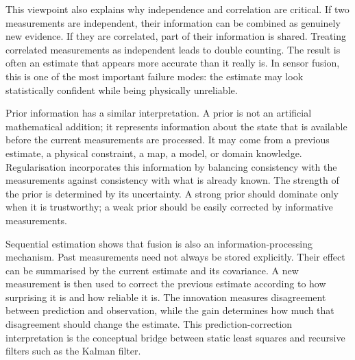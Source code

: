 \documentclass{ieeeaccess}
\newcommand{\deleted}[1]{\textcolor{red}{\sout{#1}}}
\begin{document}


This viewpoint also explains why independence and correlation are critical. If two measurements are independent, their information can be combined as genuinely new evidence. If they are correlated, part of their information is shared. Treating correlated measurements as independent leads to double counting. The result is often an estimate that appears more accurate than it really is. In sensor fusion, this is one of the most important failure modes: the estimate may look statistically confident while being physically unreliable.

Prior information has a similar interpretation. A prior is not an artificial mathematical addition; it represents information about the state that is available before the current measurements are processed. It may come from a previous estimate, a physical constraint, a map, a model, or domain knowledge. Regularisation incorporates this information by balancing consistency with the measurements against consistency with what is already known. The strength of the prior is determined by its uncertainty. A strong prior should dominate only when it is trustworthy; a weak prior should be easily corrected by informative measurements.

Sequential estimation shows that fusion is also an information-processing mechanism. Past measurements need not always be stored explicitly. Their effect can be summarised by the current estimate and its covariance. A new measurement is then used to correct the previous estimate according to how surprising it is and how reliable it is. The innovation measures disagreement between prediction and observation, while the gain determines how much that disagreement should change the estimate. This prediction-correction interpretation is the conceptual bridge between static least squares and recursive filters such as the Kalman filter.
\end{document}
